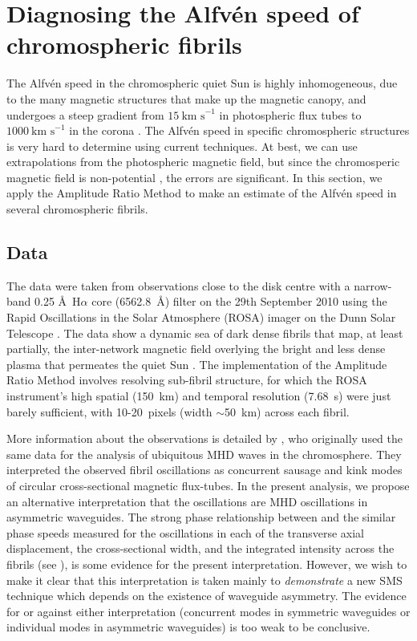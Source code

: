 \documentclass[12pt]{../style-files/ociamthesis}
\begin{document}
\section{Diagnosing the Alfv\'{e}n speed of chromospheric fibrils}
\label{sec: fibrils}

The Alfv\'{e}n speed in the chromospheric quiet Sun is highly inhomogeneous, due to the many magnetic structures that make up the magnetic canopy, and undergoes a steep gradient from $15~\text{km~s}^{-1}$ in photospheric flux tubes to $1000~\text{km~s}^{-1}$ in the corona \citep{van_etal11}. The Alfv\'{e}n speed in specific chromospheric structures is very hard to determine using current techniques. At best, we can use extrapolations from the photospheric magnetic field, but since the chromosperic magnetic field is non-potential \citep{woo_etal99,wie_etal14}, the errors are significant.
In this section, we apply the Amplitude Ratio Method to make an estimate of the Alfv\'{e}n speed in several chromospheric fibrils.


\subsection{Data} \label{sec: data}

The data were taken from observations close to the disk centre with a narrow-band 0.25 \AA~H$\alpha$ core (6562.8~\AA) filter on the 29th September 2010 using the Rapid Oscillations in the Solar Atmosphere (ROSA) imager on the Dunn Solar Telescope \citep{jes_etal10a}. The data show a dynamic sea of dark dense fibrils that map, at least partially, the inter-network magnetic field overlying the bright and less dense plasma that permeates the quiet Sun \citep{lee_etal12}. The implementation of the Amplitude Ratio Method involves resolving sub-fibril structure, for which the ROSA instrument’s high spatial (150~km) and temporal resolution (7.68~s) were just barely sufficient, with 10-20~pixels (width $\sim$50~km) across each fibril.

More information about the observations is detailed by \cite{mor_etal12}, who originally used the same data for the analysis of ubiquitous MHD waves in the chromosphere. They interpreted the observed fibril oscillations as concurrent sausage and kink modes of circular cross-sectional magnetic flux-tubes. In the present analysis, we propose an alternative interpretation that the oscillations are MHD oscillations in asymmetric waveguides. The strong phase relationship between and the similar phase speeds measured for the oscillations in each of the transverse axial displacement, the cross-sectional width, and the integrated intensity across the fibrils (see \citealp{mor_etal12}), is some evidence for the present interpretation. However, we wish to make it clear that this interpretation is taken mainly to \textit{demonstrate} a new SMS technique which depends on the existence of waveguide asymmetry. The evidence for or against either interpretation (concurrent modes in symmetric waveguides or individual modes in asymmetric waveguides) is too weak to be conclusive.
\end{document}
